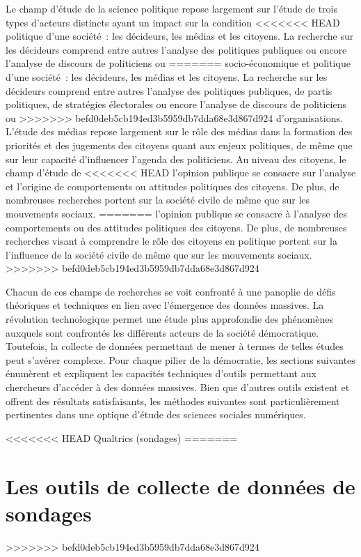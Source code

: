 \documentclass[
  letterpaper,
]{scrbook}
\begin{document}
Le champ d'étude de la science politique repose largement sur l'étude de
trois types d'acteurs distincts ayant un impact sur la condition
<<<<<<< HEAD
politique d'une société~: les décideurs, les médias et les citoyens. La
recherche sur les décideurs comprend entre autres l'analyse des
politiques publiques ou encore l'analyse de discours de politiciens ou
=======
socio-économique et politique d'une société~: les décideurs, les médias
et les citoyens. La recherche sur les décideurs comprend entre autres
l'analyse des politiques publiques, de partis politiques, de stratégies
électorales ou encore l'analyse de discours de politiciens ou
>>>>>>> befd0deb5cb194ed3b5959db7dda68e3d867d924
d'organisations. L'étude des médias repose largement sur le rôle des
médias dans la formation des priorités et des jugements des citoyens
quant aux enjeux politiques, de même que sur leur capacité d'influencer
l'agenda des politiciens. Au niveau des citoyens, le champ d'étude de
<<<<<<< HEAD
l'opinion publique se consacre sur l'analyse et l'origine de
comportements ou attitudes politiques des citoyens. De plus, de
nombreuses recherches portent sur la société civile de même que sur les
mouvements sociaux.
=======
l'opinion publique se consacre à l'analyse des comportements ou des
attitudes politiques des citoyens. De plus, de nombreuses recherches
visant à comprendre le rôle des citoyens en politique portent sur la
l'influence de la société civile de même que sur les mouvements sociaux.
>>>>>>> befd0deb5cb194ed3b5959db7dda68e3d867d924

Chacun de ces champs de recherches se voit confronté à une panoplie de
défis théoriques et techniques en lien avec l'émergence des données
massives. La révolution technologique permet une étude plus approfondie
des phénomènes auxquels sont confrontés les différents acteurs de la
société démocratique. Toutefois, la collecte de données permettant de
mener à termes de telles études peut s'avérer complexe. Pour chaque
pilier de la démocratie, les sections suivantes énumèrent et expliquent
les capacités techniques d'outils permettant aux chercheurs d'accéder à
des données massives. Bien que d'autres outils existent et offrent des
résultats satisfaisants, les méthodes suivantes sont particulièrement
pertinentes dans une optique d'étude des sciences sociales numériques.

<<<<<<< HEAD
Qualtrics (sondages)
=======
\hypertarget{les-outils-de-collecte-de-donnuxe9es-de-sondages}{%
\section{Les outils de collecte de données de
sondages}\label{les-outils-de-collecte-de-donnuxe9es-de-sondages}}
>>>>>>> befd0deb5cb194ed3b5959db7dda68e3d867d924
\end{document}
